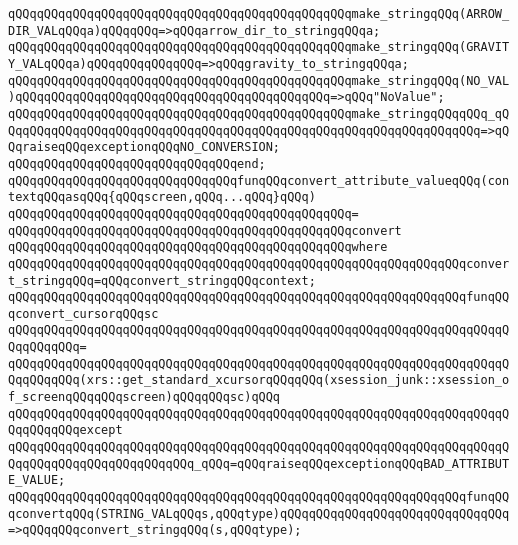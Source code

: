 \verb|qQQqqQQqqQQqqQQqqQQqqQQqqQQqqQQqqQQqqQQqqQQqqQQqmake_stringqQQq(ARROW_DIR_VALqQQqa)qQQqqQQq=>qQQqarrow_dir_to_stringqQQqa;|\newline
\verb|qQQqqQQqqQQqqQQqqQQqqQQqqQQqqQQqqQQqqQQqqQQqqQQqmake_stringqQQq(GRAVITY_VALqQQqa)qQQqqQQqqQQqqQQq=>qQQqgravity_to_stringqQQqa;|\newline
\verb|qQQqqQQqqQQqqQQqqQQqqQQqqQQqqQQqqQQqqQQqqQQqqQQqmake_stringqQQq(NO_VAL)qQQqqQQqqQQqqQQqqQQqqQQqqQQqqQQqqQQqqQQqqQQq=>qQQq"NoValue";|\newline
\verb|qQQqqQQqqQQqqQQqqQQqqQQqqQQqqQQqqQQqqQQqqQQqqQQqmake_stringqQQqqQQq_qQQqqQQqqQQqqQQqqQQqqQQqqQQqqQQqqQQqqQQqqQQqqQQqqQQqqQQqqQQqqQQqqQQq=>qQQqraiseqQQqexceptionqQQqNO_CONVERSION;|\newline
\verb|qQQqqQQqqQQqqQQqqQQqqQQqqQQqqQQqend;|\newline
\newline
\verb|qQQqqQQqqQQqqQQqqQQqqQQqqQQqqQQqfunqQQqconvert_attribute_valueqQQq(contextqQQqasqQQq{qQQqscreen,qQQq...qQQq}qQQq)|\newline
\verb|qQQqqQQqqQQqqQQqqQQqqQQqqQQqqQQqqQQqqQQqqQQqqQQq=|\newline
\verb|qQQqqQQqqQQqqQQqqQQqqQQqqQQqqQQqqQQqqQQqqQQqqQQqconvert|\newline
\verb|qQQqqQQqqQQqqQQqqQQqqQQqqQQqqQQqqQQqqQQqqQQqqQQqwhere|\newline
\verb|qQQqqQQqqQQqqQQqqQQqqQQqqQQqqQQqqQQqqQQqqQQqqQQqqQQqqQQqqQQqqQQqconvert_stringqQQq=qQQqconvert_stringqQQqcontext;|\newline
\newline
\verb|qQQqqQQqqQQqqQQqqQQqqQQqqQQqqQQqqQQqqQQqqQQqqQQqqQQqqQQqqQQqqQQqfunqQQqconvert_cursorqQQqsc|\newline
\verb|qQQqqQQqqQQqqQQqqQQqqQQqqQQqqQQqqQQqqQQqqQQqqQQqqQQqqQQqqQQqqQQqqQQqqQQqqQQqqQQq=|\newline
\verb|qQQqqQQqqQQqqQQqqQQqqQQqqQQqqQQqqQQqqQQqqQQqqQQqqQQqqQQqqQQqqQQqqQQqqQQqqQQqqQQq(xrs::get_standard_xcursorqQQqqQQq(xsession_junk::xsession_of_screenqQQqqQQqscreen)qQQqqQQqsc)qQQq|\newline
\verb|qQQqqQQqqQQqqQQqqQQqqQQqqQQqqQQqqQQqqQQqqQQqqQQqqQQqqQQqqQQqqQQqqQQqqQQqqQQqqQQqexcept|\newline
\verb|qQQqqQQqqQQqqQQqqQQqqQQqqQQqqQQqqQQqqQQqqQQqqQQqqQQqqQQqqQQqqQQqqQQqqQQqqQQqqQQqqQQqqQQqqQQqqQQq_qQQq=qQQqraiseqQQqexceptionqQQqBAD_ATTRIBUTE_VALUE;|\newline
\newline
\verb|qQQqqQQqqQQqqQQqqQQqqQQqqQQqqQQqqQQqqQQqqQQqqQQqqQQqqQQqqQQqqQQqfunqQQqconvertqQQq(STRING_VALqQQqs,qQQqtype)qQQqqQQqqQQqqQQqqQQqqQQqqQQqqQQq=>qQQqqQQqconvert_stringqQQq(s,qQQqtype);|\newline
